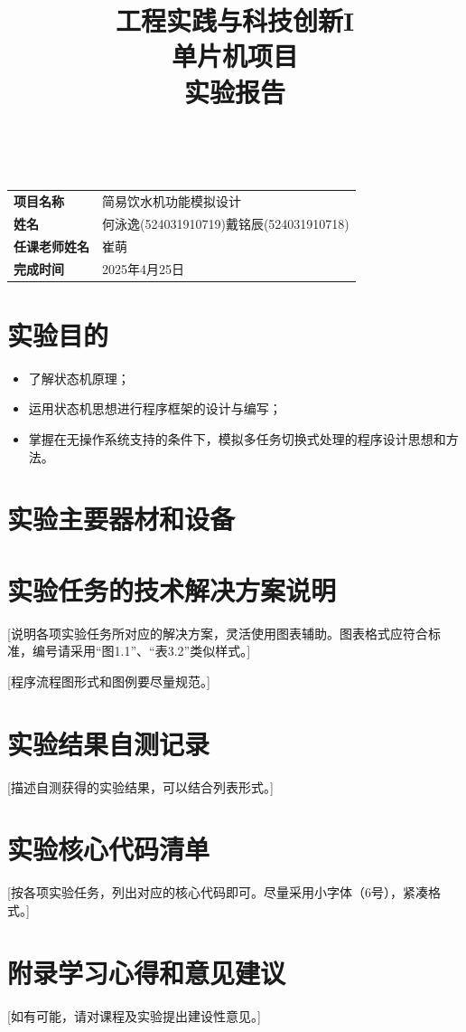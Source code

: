 \documentclass{article}
\title{工程实践与科技创新I\\单片机项目\\\textbf{实验报告}}
\author{}
\date{}
\newenvironment{itemlist}{
    \begin{itemize}[itemsep=0pt,topsep=1em,parsep=0pt,leftmargin=2em,labelsep=1em,itemindent=2em] 
}{
    \end{itemize}
}
\begin{document}
\
\pagestyle{titlepage}
\maketitle
\begin{table}
    \large
    \centering
    \begin{tabular}{ll}
        \textbf{项目名称} & 简易饮水机功能模拟设计\\
        \textbf{姓名} & 何泳逸(524031910719)\quad 戴铭辰(524031910718)\\
        \textbf{任课老师姓名} & 崔萌\\
        \textbf{完成时间} & 2025年4月25日\\
    \end{tabular}
\end{table}
\clearpage

\tableofcontents
\clearpage

\section{实验目的}
\begin{itemlist}
    \item 了解状态机原理；
    \item 运用状态机思想进行程序框架的设计与编写；
    \item 掌握在无操作系统支持的条件下，模拟多任务切换式处理的程序设计思想和方法。
\end{itemlist}
\section{实验主要器材和设备}
\section{实验任务的技术解决方案说明}
[说明各项实验任务所对应的解决方案，灵活使用图表辅助。图表格式应符合标准，编号请采用“图1.1”、“表3.2”类似样式。]

[程序流程图形式和图例要尽量规范。]

\section{实验结果自测记录}
[描述自测获得的实验结果，可以结合列表形式。]

\section{实验核心代码清单} 
[按各项实验任务，列出对应的核心代码即可。尽量采用小字体（6号），紧凑格式。]

\section*{附录\quad 学习心得和意见建议}
[如有可能，请对课程及实验提出建设性意见。]
\end{document}
